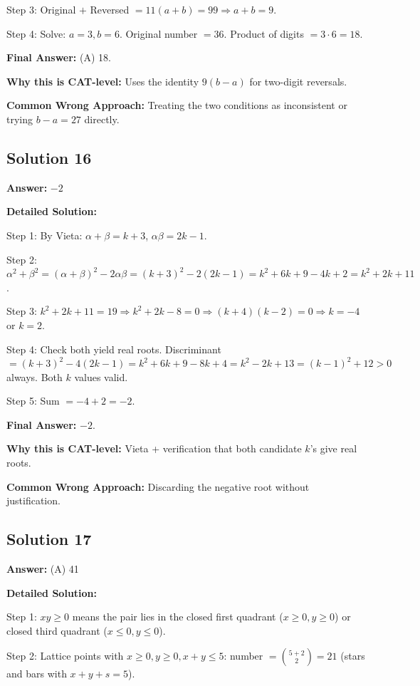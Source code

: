 \documentclass[11pt]{article}
\begin{document}
Step 3: Original $+$ Reversed $= 11(a + b) = 99 \Rightarrow a + b = 9$.

Step 4: Solve: $a = 3, b = 6$. Original number $= 36$. Product of digits $= 3 \cdot 6 = 18$.

\textbf{Final Answer:} (A) 18.

\textbf{Why this is CAT-level:} Uses the identity $9(b - a)$ for two-digit reversals.

\textbf{Common Wrong Approach:} Treating the two conditions as inconsistent or trying $b - a = 27$ directly.

\subsection*{Solution 16}
\textbf{Answer:} $-2$

\textbf{Detailed Solution:}

Step 1: By Vieta: $\alpha + \beta = k + 3$, $\alpha \beta = 2k - 1$.

Step 2: $\alpha^2 + \beta^2 = (\alpha + \beta)^2 - 2\alpha\beta = (k+3)^2 - 2(2k - 1) = k^2 + 6k + 9 - 4k + 2 = k^2 + 2k + 11$.

Step 3: $k^2 + 2k + 11 = 19 \Rightarrow k^2 + 2k - 8 = 0 \Rightarrow (k + 4)(k - 2) = 0 \Rightarrow k = -4$ or $k = 2$.

Step 4: Check both yield real roots. Discriminant $= (k+3)^2 - 4(2k-1) = k^2 + 6k + 9 - 8k + 4 = k^2 - 2k + 13 = (k-1)^2 + 12 > 0$ always. Both $k$ values valid.

Step 5: Sum $= -4 + 2 = -2$.

\textbf{Final Answer:} $-2$.

\textbf{Why this is CAT-level:} Vieta + verification that both candidate $k$'s give real roots.

\textbf{Common Wrong Approach:} Discarding the negative root without justification.

\subsection*{Solution 17}
\textbf{Answer:} (A) 41

\textbf{Detailed Solution:}

Step 1: $xy \ge 0$ means the pair lies in the closed first quadrant ($x \ge 0, y \ge 0$) or closed third quadrant ($x \le 0, y \le 0$).

Step 2: Lattice points with $x \ge 0, y \ge 0, x + y \le 5$: number $= \binom{5 + 2}{2} = 21$ (stars and bars with $x + y + s = 5$).
\end{document}

